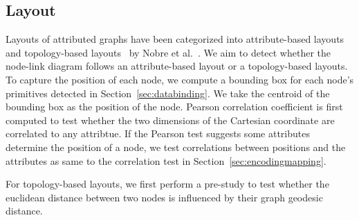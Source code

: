 \subsection{Layout}
Layouts of attributed graphs have been categorized into attribute-based layouts~\cite{} and topology-based layouts~\cite{} by Nobre et al.~\cite{DBLP:journals/cgf/NobreMSL19}.
We aim to detect whether the node-link diagram follows an attribute-based layout or a topology-based layouts.
To capture the position of each node, we compute a bounding box for each node's primitives detected in Section~\ref{sec:databinding}.
We take the centroid of the bounding box as the position of the node.
Pearson correlation coefficient is first computed to test whether the two dimensions of the Cartesian coordinate are correlated to any attribtue.
If the Pearson test suggests some attributes determine the position of a node,
we test correlations between positions and the attributes as same to the correlation test in Section~\ref{sec:encodingmapping}.

For topology-based layouts, we first perform a pre-study to test whether the euclidean distance between two nodes is influenced by their graph geodesic distance.
